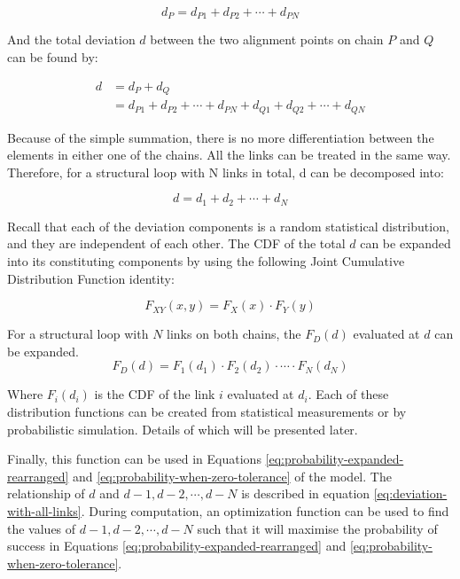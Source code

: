 \begin{equation}
    d_P = d_{P1} + d_{P2} + \cdots + d_{PN}
\end{equation}

And the total deviation $d$ between the two alignment points on chain $P$ and $Q$ can be found by:

\begin{align} \label{eq:deviation-with-two-links}
    d &= d_P + d_Q \nonumber\\
      &= d_{P1} + d_{P2} + \cdots + d_{PN} + d_{Q1} + d_{Q2} + \cdots + d_{QN} 
\end{align}

Because of the simple summation, there is no more differentiation between the elements in either one of the chains. All the links can be treated in the same way. Therefore, for a structural loop with N links in total, d can be decomposed into:

\begin{equation} \label{eq:deviation-with-all-links}
    d = d_1 + d_2 + \cdots + d_N
\end{equation}

Recall that each of the deviation components is a random statistical distribution, and they are independent of each other. The CDF of the total $d$ can be expanded into its constituting components by using the following Joint Cumulative Distribution Function identity:

\begin{equation}
    F_{XY}(x,y) = F_X(x) \cdot F_Y(y)
\end{equation}

For a structural loop with $N$ links on both chains, the $F_D(d)$ evaluated at $d$ can be expanded. 
\begin{equation}  \label{eq:probability-with-all-links}
    F_D(d) = F_1(d_1) \cdot F_2(d_2) \cdot \cdots \cdot F_N(d_N)
\end{equation}

Where $F_i(d_i)$ is the CDF of the link $i$ evaluated at $d_i$. Each of these distribution functions can be created from statistical measurements or by probabilistic simulation. Details of which will be presented later.

Finally, this function can be used in Equations \ref{eq:probability-expanded-rearranged} and \ref{eq:probability-when-zero-tolerance} of the model. The relationship of $d$ and $d-1, d-2, \cdots , d-N$ is described in equation \ref{eq:deviation-with-all-links}. During computation, an optimization function can be used to find the values of $d-1, d-2, \cdots , d-N$ such that it will maximise the probability of success in Equations \ref{eq:probability-expanded-rearranged} and \ref{eq:probability-when-zero-tolerance}.

